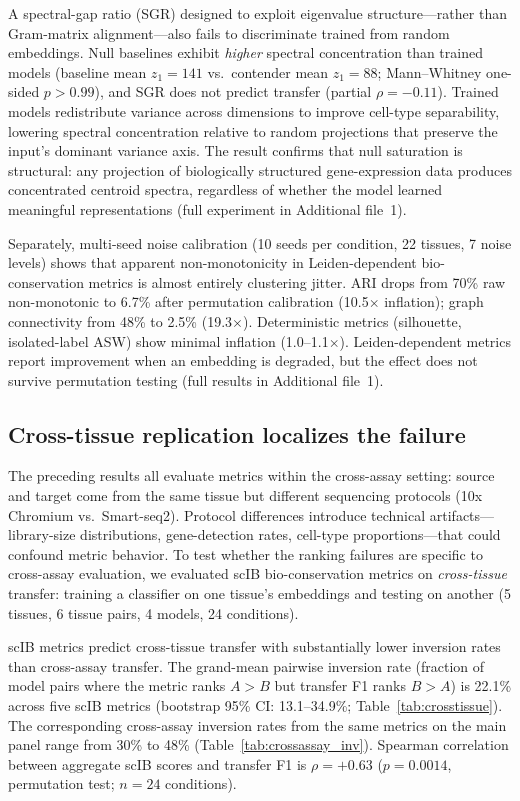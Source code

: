 \documentclass[11pt]{article}
\begin{document}
A spectral-gap ratio (SGR) designed to exploit eigenvalue
structure---rather than Gram-matrix alignment---also fails to
discriminate trained from random embeddings. Null baselines exhibit
\emph{higher} spectral concentration than trained models (baseline mean
$z_1 = 141$ vs.\ contender mean $z_1 = 88$; Mann--Whitney one-sided
$p > 0.99$), and SGR does not predict transfer (partial
$\rho = -0.11$). Trained models redistribute variance across dimensions
to improve cell-type separability, lowering spectral concentration
relative to random projections that preserve the input's dominant
variance axis. The result confirms that null saturation is structural:
any projection of biologically structured gene-expression data produces
concentrated centroid spectra, regardless of whether the model learned
meaningful representations (full experiment in
Additional file~1).

Separately, multi-seed noise calibration (10 seeds per condition, 22
tissues, 7 noise levels) shows that apparent non-monotonicity in
Leiden-dependent bio-conservation metrics is almost entirely clustering
jitter. ARI drops from 70\% raw non-monotonic to 6.7\% after
permutation calibration (10.5$\times$ inflation); graph connectivity
from 48\% to 2.5\% (19.3$\times$). Deterministic metrics (silhouette,
isolated-label ASW) show minimal inflation (1.0--1.1$\times$).
Leiden-dependent metrics report improvement when an embedding is
degraded, but the effect does not survive permutation testing (full
results in Additional file~1).


\subsection{Cross-tissue replication localizes the failure}
\label{sec:crosstissue}

The preceding results all evaluate metrics within the cross-assay
setting: source and target come from the same tissue but different
sequencing protocols (10x Chromium vs.\ Smart-seq2). Protocol
differences introduce technical artifacts---library-size distributions,
gene-detection rates, cell-type proportions---that could confound metric
behavior. To test whether the ranking failures are specific to
cross-assay evaluation, we evaluated scIB bio-conservation metrics on
\emph{cross-tissue} transfer: training a classifier on one tissue's
embeddings and testing on another (5 tissues, 6 tissue pairs, 4 models,
24 conditions).

scIB metrics predict cross-tissue transfer with substantially lower
inversion rates than cross-assay transfer. The grand-mean pairwise
inversion rate (fraction of model pairs where the metric ranks
$A > B$ but transfer F1 ranks $B > A$) is 22.1\% across five scIB
metrics (bootstrap 95\% CI: 13.1--34.9\%;
Table~\ref{tab:crosstissue}). The corresponding cross-assay inversion
rates from the same metrics on the main panel range from 30\% to 48\%
(Table~\ref{tab:crossassay_inv}). Spearman correlation between
aggregate scIB scores and transfer F1 is $\rho = +0.63$ ($p = 0.0014$,
permutation test; $n = 24$ conditions).
\end{document}
